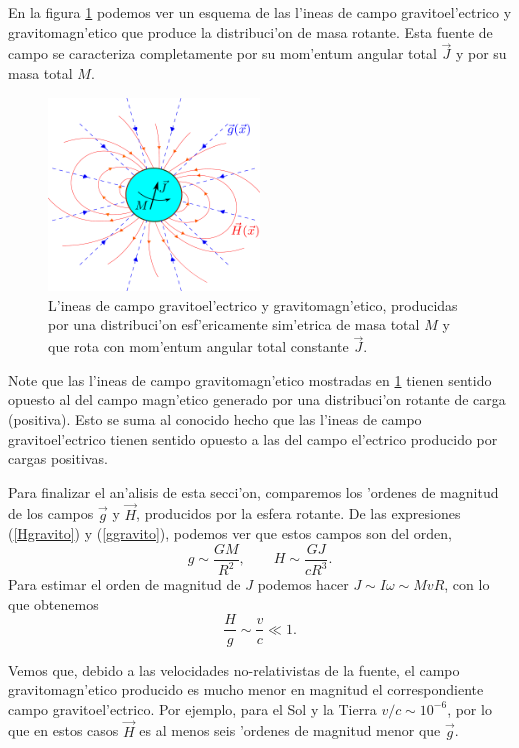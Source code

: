 En la figura \ref{fig:gravitoelectromagnetico} podemos ver un esquema de las l'ineas de campo gravitoel'ectrico y gravitomagn'etico que produce la distribuci'on de masa rotante. Esta fuente de campo se caracteriza completamente por su mom'entum angular total $\vec{J}$ y por su masa total $M$.
\begin{figure}[H]
\centering
\includegraphics[angle=0,width=0.5\textwidth]{fig/fig-gravitoelectromagnetico.pdf}
\caption{L'ineas de campo gravitoel'ectrico y gravitomagn'etico, producidas por una distribuci'on esf'ericamente sim'etrica de masa total $M$ y que rota con mom'entum angular total constante $\vec{J}$.}
\label{fig:gravitoelectromagnetico}
\end{figure}

Note que las l'ineas de campo gravitomagn'etico mostradas en \ref{fig:gravitoelectromagnetico} tienen sentido opuesto al del campo magn'etico generado por una distribuci'on rotante de carga (positiva). Esto se suma al conocido hecho que las l'ineas de campo gravitoel'ectrico tienen sentido opuesto a las del campo el'ectrico producido por cargas positivas.

Para finalizar el an'alisis de esta secci'on, comparemos los 'ordenes de magnitud de los campos $\vec{g}$ y $\vec{H}$, producidos por la esfera rotante. De las expresiones (\ref{Hgravito}) y (\ref{ggravito}), podemos ver que estos campos son del orden,
\begin{equation}\label{magg}
g\sim \frac{GM}{R^2}, \qquad H\sim \frac{GJ}{cR^3}.
\end{equation}
Para estimar el orden de magnitud de $J$ podemos hacer $J\sim I\omega\sim MvR$, con lo que obtenemos
\begin{equation}
\frac{H}{g}\sim\frac{v}{c}\ll 1.
\end{equation}

Vemos que, debido a las velocidades no-relativistas de la fuente, el campo gravitomagn'etico producido es mucho menor en magnitud el correspondiente campo gravitoel'ectrico. Por ejemplo, para el Sol y la Tierra $v/c\sim10^{-6}$, por lo que en estos casos $\vec{H}$ es al menos seis 'ordenes de magnitud menor que $\vec{g}$.

